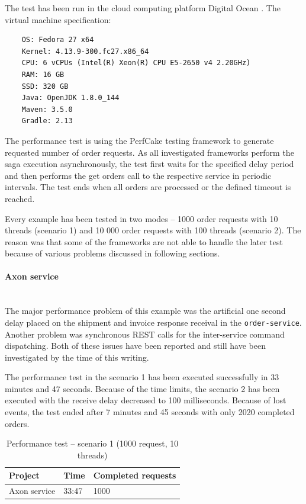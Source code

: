 \documentclass[oneside,
  digital, %
  table,   %
  nolof,     %
  nolot,     %
]{fithesis3}
\newcommand{\newlinepar}[1]{\paragraph{#1}\needspace{4\baselineskip}\mbox{}\\}
\begin{document}
The test has been run in the cloud computing platform Digital Ocean \cite{digital-ocean}. The virtual machine specification:

\begin{verbatim}
    OS: Fedora 27 x64
    Kernel: 4.13.9-300.fc27.x86_64
    CPU: 6 vCPUs (Intel(R) Xeon(R) CPU E5-2650 v4 2.20GHz)
    RAM: 16 GB
    SSD: 320 GB
    Java: OpenJDK 1.8.0_144
    Maven: 3.5.0
    Gradle: 2.13
\end{verbatim}

The performance test is using the PerfCake \cite{perfcake} testing framework to generate requested number of order requests. As all investigated frameworks perform the saga execution asynchronously, the test first waits for the specified delay period and then performs the get orders call to the respective service in periodic intervals. The test ends when all orders are processed or the defined timeout is reached.

Every example has been tested in two modes -- 1000 order requests with 10 threads (scenario 1) and 10 000 order requests with 100 threads (scenario 2). The reason was that some of the frameworks are not able to handle the later test because of various problems discussed in following sections.

\newlinepar{Axon service}

The major performance problem of this example was the artificial one second delay placed on the shipment and invoice response receival in the \texttt{order-service}. Another problem was synchronous REST calls for the inter-service command dispatching. Both of these issues have been reported and still have been investigated by the time of this writing.

The performance test in the scenario 1 has been executed successfully in 33 minutes and 47 seconds. Because of the time limits, the scenario 2 has been executed with the receive delay decreased to 100 milliseconds. Because of lost events, the test ended after 7 minutes and 45 seconds with only 2020 completed orders.



\begin{table}[h]
    \begin{tabularx}{\textwidth}{XXX}
        \toprule
        Project & Time & Completed requests \\
        \midrule
        Axon service & 33:47 & 1000 \\
        \bottomrule
    \end{tabularx}
    \caption{Performance test -- scenario 1 (1000 request, 10 threads)}
    \label{tab:performance-scenario-1}
\end{table}
\end{document}
